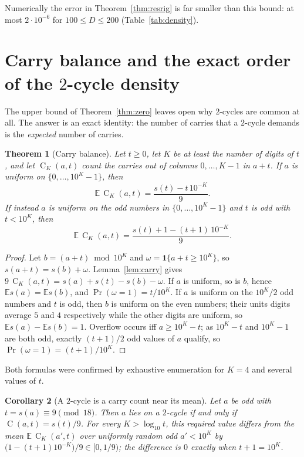 \documentclass[11pt]{article}
\newtheorem{theorem}{Theorem}[section]
\newtheorem{corollary}[theorem]{Corollary}
\theoremstyle{definition}
\theoremstyle{remark}
\newcommand{\C}{\operatorname{C}}
\begin{document}
Numerically the error in Theorem~\ref{thm:resrig} is far smaller than this
bound: at most $2\cdot10^{-6}$ for $100\le D\le200$ (Table~\ref{tab:density}).

\section{Carry balance and the exact order of the $2$-cycle density}\label{sec:balance}

The upper bound of Theorem~\ref{thm:zero} leaves open why $2$-cycles are
common at all. The answer is an exact identity: the number of carries that a
$2$-cycle demands is the \emph{expected} number of carries.

\begin{theorem}[Carry balance]\label{thm:balance}
Let $t\ge0$, let $K$ be at least the number of digits of $t$, and let
$\C_K(a,t)$ count the carries out of columns $0,\dots,K-1$ in $a+t$. If $a$ is
uniform on $\{0,\dots,10^K-1\}$, then
\[
  \mathbb E\,\C_K(a,t)=\frac{s(t)-t\,10^{-K}}{9}.
\]
If instead $a$ is uniform on the odd numbers in $\{0,\dots,10^K-1\}$ and $t$ is
odd with $t<10^K$, then
\[
  \mathbb E\,\C_K(a,t)=\frac{s(t)+1-(t+1)\,10^{-K}}{9}.
\]
\end{theorem}

\begin{proof}
Let $b=(a+t)\bmod10^K$ and $\omega=\mathbf 1\{a+t\ge10^K\}$, so
$s(a+t)=s(b)+\omega$. Lemma~\ref{lem:carry} gives
$9\,\C_K(a,t)=s(a)+s(t)-s(b)-\omega$. If $a$ is uniform, so is $b$, hence
$\mathbb E s(a)=\mathbb E s(b)$, and $\Pr(\omega=1)=t/10^K$. If $a$ is uniform
on the $10^K/2$ odd numbers and $t$ is odd, then $b$ is uniform on the even
numbers; their units digits average $5$ and $4$ respectively while the other
digits are uniform, so $\mathbb E s(a)-\mathbb E s(b)=1$. Overflow occurs iff
$a\ge10^K-t$; as $10^K-t$ and $10^K-1$ are both odd, exactly $(t+1)/2$ odd
values of $a$ qualify, so $\Pr(\omega=1)=(t+1)/10^K$.
\end{proof}

Both formulas were confirmed by exhaustive enumeration for $K=4$ and several
values of $t$.

\begin{corollary}[A $2$-cycle is a carry count near its mean]\label{cor:mean}
Let $a$ be odd with $t=s(a)\equiv9\pmod{18}$. Then $a$ lies on a $2$-cycle if
and only if $\C(a,t)=s(t)/9$. For every $K>\log_{10}t$, this required value
differs from the mean $\mathbb E\,\C_K(a',t)$ over uniformly random odd
$a'<10^K$ by $\bigl(1-(t+1)10^{-K}\bigr)/9\in[0,1/9)$; the difference is $0$
exactly when $t+1=10^K$.
\end{corollary}
\end{document}
